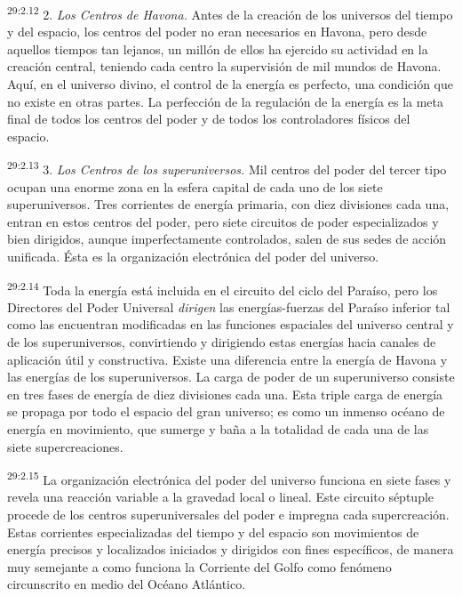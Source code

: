 \par
\textsuperscript{29:2.12} 2. \textit{Los Centros de Havona.} Antes de la creación de los universos del tiempo y del espacio, los centros del poder no eran necesarios en Havona, pero desde aquellos tiempos tan lejanos, un millón de ellos ha ejercido su actividad en la creación central, teniendo cada centro la supervisión de mil mundos de Havona. Aquí, en el universo divino, el control de la energía es perfecto, una condición que no existe en otras partes. La perfección de la regulación de la energía es la meta final de todos los centros del poder y de todos los controladores físicos del espacio.

\par
\textsuperscript{29:2.13} 3. \textit{Los Centros de los superuniversos.} Mil centros del poder del tercer tipo ocupan una enorme zona en la esfera capital de cada uno de los siete superuniversos. Tres corrientes de energía primaria, con diez divisiones cada una, entran en estos centros del poder, pero siete circuitos de poder especializados y bien dirigidos, aunque imperfectamente controlados, salen de sus sedes de acción unificada. Ésta es la organización electrónica del poder del universo.

\par
\textsuperscript{29:2.14} Toda la energía está incluida en el circuito del ciclo del Paraíso, pero los Directores del Poder Universal \textit{dirigen} las energías-fuerzas del Paraíso inferior tal como las encuentran modificadas en las funciones espaciales del universo central y de los superuniversos, convirtiendo y dirigiendo estas energías hacia canales de aplicación útil y constructiva. Existe una diferencia entre la energía de Havona y las energías de los superuniversos. La carga de poder de un superuniverso consiste en tres fases de energía de diez divisiones cada una. Esta triple carga de energía se propaga por todo el espacio del gran universo; es como un inmenso océano de energía en movimiento, que sumerge y baña a la totalidad de cada una de las siete supercreaciones.

\par
\textsuperscript{29:2.15} La organización electrónica del poder del universo funciona en siete fases y revela una reacción variable a la gravedad local o lineal. Este circuito séptuple procede de los centros superuniversales del poder e impregna cada supercreación. Estas corrientes especializadas del tiempo y del espacio son movimientos de energía precisos y localizados iniciados y dirigidos con fines específicos, de manera muy semejante a como funciona la Corriente del Golfo como fenómeno circunscrito en medio del Océano Atlántico.

